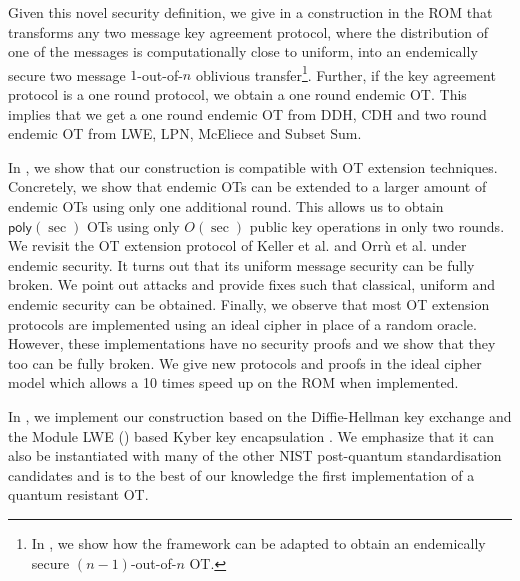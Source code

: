 Given this novel security definition, we give in  a construction in the ROM that transforms any two message key agreement protocol, where the distribution of one of the messages is computationally close to uniform, into an endemically secure two message $1$-out-of-$n$ oblivious transfer\footnote{In , we show how the framework can be adapted to obtain an endemically secure $(n-1)$-out-of-$n$ OT.}. Further, 
if the key agreement protocol is a one round protocol, we obtain a one round endemic OT. This implies that we get a one round endemic OT from DDH, CDH and two round endemic OT from LWE, LPN, McEliece and Subset Sum.

In , we show that our construction is compatible with OT extension techniques. Concretely, we show that endemic OTs can be extended to a larger amount of endemic OTs using only one additional round. This allows us to obtain $\mathsf{poly}(\sec)$ OTs using only $O(\sec)$ public key operations in only two rounds. We revisit the OT extension protocol of Keller et al. and Orr{\`u} et al. \cite{C:KelOrsSch15,RSA:OrrOrsSch17} under endemic security. It turns out that its uniform message security can be fully broken. We point out attacks and provide fixes such that classical, uniform and endemic security can be obtained. Finally, we observe that most OT extension protocols are implemented \cite{libOTe,KOS,EMP} using an ideal cipher in place of a random oracle. However, these implementations have no security proofs and we show that they too can be fully broken. We give new protocols and proofs in the ideal cipher model which allows a 10 times speed up on the ROM when implemented. 

In , we implement our construction based on the Diffie-Hellman key exchange and the Module LWE (\MLWE) based Kyber key encapsulation \cite{NISTPQC-R1:CRYSTALS-KYBER17}. We emphasize that it can also be instantiated with many of the other NIST post-quantum standardisation candidates and is to the best of our knowledge the first implementation of a quantum resistant OT.


